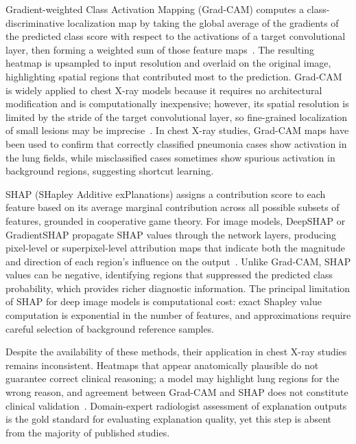 \documentclass[preprint,12pt]{elsarticle}
\begin{document}
Gradient-weighted Class Activation Mapping (Grad-CAM) computes a
class-discriminative localization map by taking the global average of
the gradients of the predicted class score with respect to the
activations of a target convolutional layer, then forming a weighted
sum of those feature maps~\cite{chouhan2020}.
The resulting heatmap is upsampled to input resolution and overlaid
on the original image, highlighting spatial regions that contributed
most to the prediction.
Grad-CAM is widely applied to chest X-ray models because it requires
no architectural modification and is computationally inexpensive;
however, its spatial resolution is limited by the stride of the target
convolutional layer, so fine-grained localization of small lesions
may be imprecise~\cite{reshan2023}.
In chest X-ray studies, Grad-CAM maps have been used to confirm that
correctly classified pneumonia cases show activation in the lung
fields, while misclassified cases sometimes show spurious activation
in background regions, suggesting shortcut learning.

SHAP (SHapley Additive exPlanations) assigns a contribution score to
each feature based on its average marginal contribution across all
possible subsets of features, grounded in cooperative game theory.
For image models, DeepSHAP or GradientSHAP propagate SHAP values
through the network layers, producing pixel-level or superpixel-level
attribution maps that indicate both the magnitude and direction of
each region's influence on the output~\cite{reshan2023}.
Unlike Grad-CAM, SHAP values can be negative, identifying regions
that suppressed the predicted class probability, which provides
richer diagnostic information.
The principal limitation of SHAP for deep image models is
computational cost: exact Shapley value computation is exponential
in the number of features, and approximations require careful
selection of background reference samples.

Despite the availability of these methods, their application in chest
X-ray studies remains inconsistent.
Heatmaps that appear anatomically plausible do not guarantee correct
clinical reasoning; a model may highlight lung regions for the wrong
reason, and agreement between Grad-CAM and SHAP does not constitute
clinical validation~\cite{hashmi2020}.
Domain-expert radiologist assessment of explanation outputs is the
gold standard for evaluating explanation quality, yet this step is
absent from the majority of published studies.

\end{document}
